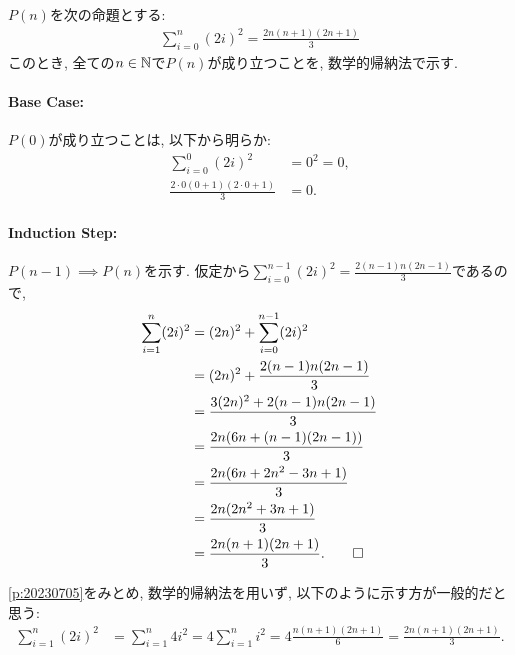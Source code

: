 \begin{proof*}
  $P(n)$を次の命題とする:
  \begin{align*}
    \sum_{i=0}^{n}(2i)^2=\frac{2n(n+1)(2n+1)}{3}
  \end{align*}
  このとき,
  全ての$n\in\mathbb{N}$で$P(n)$が成り立つことを,
  数学的帰納法で示す.

  \paragraph{Base Case:}
  $P(0)$が成り立つことは, 以下から明らか:
  \begin{align*}
    \sum_{i=0}^{0}(2i)^2&=0^2=0,\\
    \frac{2\cdot 0(0+1)(2\cdot 0+1)}{3}&=0.
  \end{align*}

  \paragraph{Induction Step:}
  $P(n-1)\implies P(n)$を示す.
  仮定から$\sum_{i=0}^{n-1}(2i)^2=\frac{2(n-1)n(2n-1)}{3}$であるので,
  \begin{align*}
    \sum_{i=1}^{n}(2i)^2&=(2n)^2+\sum_{i=0}^{n-1}(2i)^2\\
    &=(2n)^2+\frac{2(n-1)n(2n-1)}{3}\\
    &=\frac{3(2n)^2+2(n-1)n(2n-1)}{3}\\
    &=\frac{2n(6n+(n-1)(2n-1))}{3}\\
    &=\frac{2n(6n+2n^2-3n+1)}{3}\\
    &=\frac{2n(2n^2+3n+1)}{3}\\
    &=\frac{2n(n+1)(2n+1)}{3}
    .\qedhere
  \end{align*}
\end{proof*}


\begin{rem}
  \cref{p:20230705}をみとめ,
  数学的帰納法を用いず, 以下のように示す方が一般的だと思う:
  \begin{align*}
    \sum_{i=1}^{n}(2i)^2&=
    \sum_{i=1}^{n}4i^2=
    4\sum_{i=1}^{n}i^2=
    4\frac{n(n+1)(2n+1)}{6}=
    \frac{2n(n+1)(2n+1)}{3}.
  \end{align*}
\end{rem}


